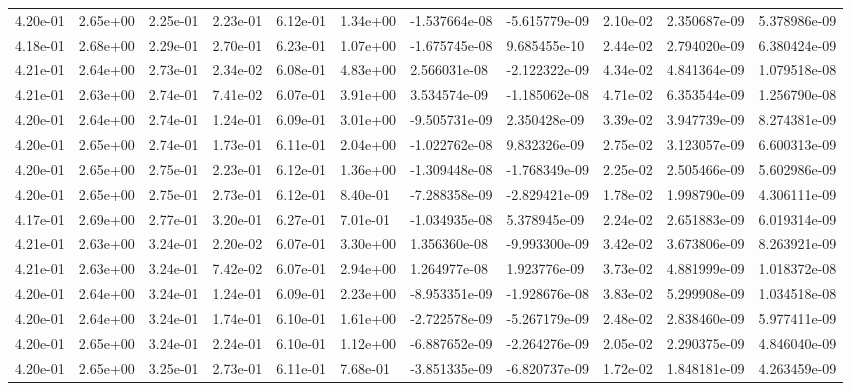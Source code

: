 \begin{longtable}{| p{} | p{} |}
4.20e-01 & 2.65e+00 & 2.25e-01 & 2.23e-01 & 6.12e-01 & 1.34e+00 & -1.537664e-08 & -5.615779e-09 &  2.10e-02 &  2.350687e-09 &  5.378986e-09 \\
4.18e-01 & 2.68e+00 & 2.29e-01 & 2.70e-01 & 6.23e-01 & 1.07e+00 & -1.675745e-08 &  9.685455e-10 &  2.44e-02 &  2.794020e-09 &  6.380424e-09 \\
4.21e-01 & 2.64e+00 & 2.73e-01 & 2.34e-02 & 6.08e-01 & 4.83e+00 &  2.566031e-08 & -2.122322e-09 &  4.34e-02 &  4.841364e-09 &  1.079518e-08 \\
4.21e-01 & 2.63e+00 & 2.74e-01 & 7.41e-02 & 6.07e-01 & 3.91e+00 &  3.534574e-09 & -1.185062e-08 &  4.71e-02 &  6.353544e-09 &  1.256790e-08 \\
4.20e-01 & 2.64e+00 & 2.74e-01 & 1.24e-01 & 6.09e-01 & 3.01e+00 & -9.505731e-09 &  2.350428e-09 &  3.39e-02 &  3.947739e-09 &  8.274381e-09 \\
4.20e-01 & 2.65e+00 & 2.74e-01 & 1.73e-01 & 6.11e-01 & 2.04e+00 & -1.022762e-08 &  9.832326e-09 &  2.75e-02 &  3.123057e-09 &  6.600313e-09 \\
4.20e-01 & 2.65e+00 & 2.75e-01 & 2.23e-01 & 6.12e-01 & 1.36e+00 & -1.309448e-08 & -1.768349e-09 &  2.25e-02 &  2.505466e-09 &  5.602986e-09 \\
4.20e-01 & 2.65e+00 & 2.75e-01 & 2.73e-01 & 6.12e-01 & 8.40e-01 & -7.288358e-09 & -2.829421e-09 &  1.78e-02 &  1.998790e-09 &  4.306111e-09 \\
4.17e-01 & 2.69e+00 & 2.77e-01 & 3.20e-01 & 6.27e-01 & 7.01e-01 & -1.034935e-08 &  5.378945e-09 &  2.24e-02 &  2.651883e-09 &  6.019314e-09 \\
4.21e-01 & 2.63e+00 & 3.24e-01 & 2.20e-02 & 6.07e-01 & 3.30e+00 &  1.356360e-08 & -9.993300e-09 &  3.42e-02 &  3.673806e-09 &  8.263921e-09 \\
4.21e-01 & 2.63e+00 & 3.24e-01 & 7.42e-02 & 6.07e-01 & 2.94e+00 &  1.264977e-08 &  1.923776e-09 &  3.73e-02 &  4.881999e-09 &  1.018372e-08 \\
4.20e-01 & 2.64e+00 & 3.24e-01 & 1.24e-01 & 6.09e-01 & 2.23e+00 & -8.953351e-09 & -1.928676e-08 &  3.83e-02 &  5.299908e-09 &  1.034518e-08 \\
4.20e-01 & 2.64e+00 & 3.24e-01 & 1.74e-01 & 6.10e-01 & 1.61e+00 & -2.722578e-09 & -5.267179e-09 &  2.48e-02 &  2.838460e-09 &  5.977411e-09 \\
4.20e-01 & 2.65e+00 & 3.24e-01 & 2.24e-01 & 6.10e-01 & 1.12e+00 & -6.887652e-09 & -2.264276e-09 &  2.05e-02 &  2.290375e-09 &  4.846040e-09 \\
4.20e-01 & 2.65e+00 & 3.25e-01 & 2.73e-01 & 6.11e-01 & 7.68e-01 & -3.851335e-09 & -6.820737e-09 &  1.72e-02 &  1.848181e-09 &  4.263459e-09 \\

\end{longtable}
